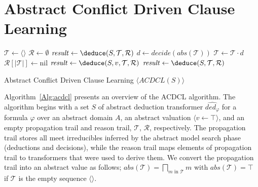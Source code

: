\section{Abstract Conflict Driven Clause Learning}
%
\begin{algorithm2e}[t]
\DontPrintSemicolon
{}
\begin{small}
$\mathcal{T} \leftarrow \langle\rangle$ \;
$\mathcal{R} \leftarrow \emptyset$ \;
$\mathit{result} \leftarrow \deduce(S,\mathcal{T},\mathcal{R})$ \;
 {
  \return \safe}
{
 {
  \return \unsafe}
  $d \leftarrow decide(\mathit{abs}(\mathcal{T}))$ \;
  $\mathcal{T} \leftarrow \mathcal{T} \cdot d$ \; 
  $\mathcal{R}[|\mathcal{T}|] \leftarrow $\textsf{nil} \;
  $\mathit{result} \leftarrow \deduce(S,v,\mathcal{T},\mathcal{R})$\;
   {
     {
      \return \safe
    }
    $\mathit{result} \leftarrow \deduce(S,\mathcal{T},\mathcal{R})$ \;
  }
}
\end{small}
\caption{Abstract Conflict Driven Clause Learning $\langle ACDCL(S) \rangle$ \label{Alg:acdcl}}
\end{algorithm2e}
%
Algorithm~\ref{Alg:acdcl} presents an overview of the ACDCL algorithm.
The algorithm begins with a set $S$ of abstract deduction transformer 
$\widehat{ded_{\varphi}}$  for a formula $\varphi$ over an abstract 
domain $A$, an abstract valuation $\langle v \leftarrow \top \rangle$, 
and an empty propagation trail and reason trail, $\mathcal{T}$, $\mathcal{R}$, 
respectively.  The propagation trail stores all meet irreducibles inferred 
by the abstract model search phase (deductions and decisions), while the 
reason trail maps elements of propagation trail to transformers that were 
used to derive them. We convert the propagation trail into an abstract value as follows; $\mathit{abs}(\mathcal{T})=\bigsqcap_{m\text{ in }\mathcal{T}}m$ with $\mathit{abs}(\mathcal{T})=\top$ if $\mathcal{T}$ is the empty sequence $\langle\rangle$.


